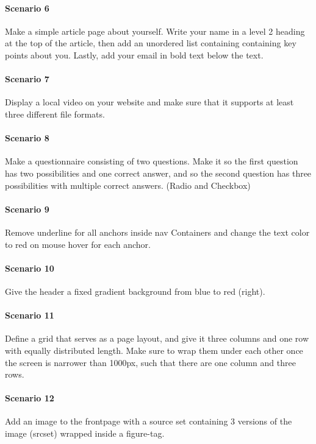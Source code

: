 \documentclass[12pt]{article}
\begin{document}
\paragraph{Scenario 6}
Make a simple article page about yourself. Write your name in a level 2 heading at the top of the article, then add an unordered list containing containing key points about you. Lastly, add your email in bold text below the text.

\paragraph{Scenario 7}
Display a local video on your website and make sure that it supports at least three different file formats.

\paragraph{Scenario 8}
Make a questionnaire consisting of two questions. Make it so the first question has two possibilities and one correct answer, and so the second question has three possibilities with multiple correct answers. (Radio and Checkbox)

\paragraph{Scenario 9}
Remove underline for all anchors inside nav Containers and change the text color to red on mouse hover for each anchor.
    
\paragraph{Scenario 10}
Give the header a fixed gradient background from blue to red (right).

\paragraph{Scenario 11}
Define a grid that serves as a page layout, and give it three columns and one row with equally distributed length. Make sure to wrap them under each other once the screen is narrower than 1000px, such that there are one column and three rows.

\paragraph{Scenario 12}
Add an image to the frontpage with a source set containing 3 versions of the image (srcset) wrapped inside a 
figure-tag.
\end{document}
